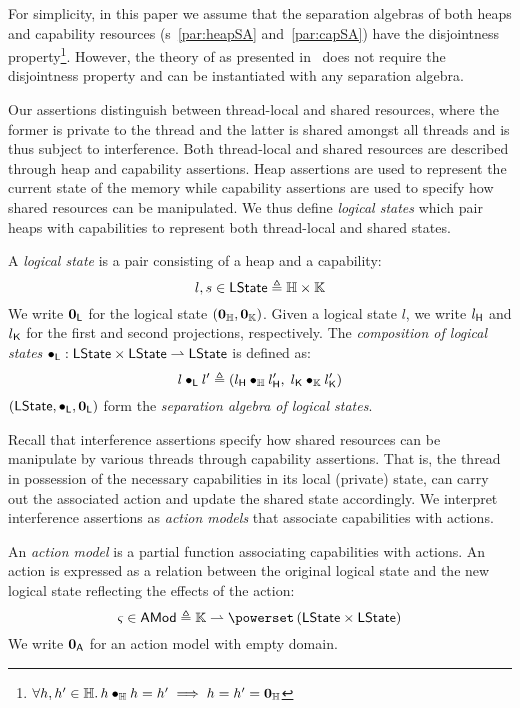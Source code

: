 For simplicity, in this paper we assume that the separation algebras of both heaps and capability resources (\param s~\ref{par:heapSA} and~\ref{par:capSA}) have the disjointness property\footnote{$\forall h, h' \in \mathbb{H}.\, h \bullet_{\mathbb{H}} h = h' \implies h = h' = \mathbf{0}_{\mathbb{H}}$}. However, the theory of \colosl as presented in~\cite{techreport} does not require the disjointness property and can be instantiated with any separation algebra.

Our assertions distinguish between thread-local and shared resources, where the former is private to the thread and the latter is shared amongst all threads and is thus subject to interference. Both thread-local and shared resources are described through heap and capability assertions. Heap assertions are used to represent the current state of the memory while capability assertions are used to specify how shared resources can be manipulated. We thus define \emph{logical states} which pair heaps with capabilities to represent both thread-local and shared states.
%
\begin{definition}A \emph{logical state} is a pair consisting of a heap and a capability:
%
\[
	l, s \in \textsf{LState} \triangleq \mathbb{H} \times \mathbb{K}
\]
%
We write $\mathbf{0}_{\textsf{L}}$ for the logical state $(\mathbf{0}_{\mathbb{H}}, \mathbf{0}_{\mathbb{K}})$. Given a logical state $l$, we write $l_{\textsf{H}}$ and $l_{\textsf{K}}$ for the first and second projections, respectively. The \emph{composition of logical states}
%
$
	\bullet_{\textsf{L}} : \textsf{LState} \times \textsf{LState} \rightharpoonup \textsf{LState}
$
%
is defined as:
%
\[
	l \bullet_{\textsf{L}} l' \triangleq (l_{\textsf{H}} \bullet_{\mathbb{H}} l'_{\textsf{H}},\; l_{\textsf{K}} \bullet_{\mathbb{K}} l'_{\textsf{K}})
\]
%
$(\textsf{LState}, \bullet_{\textsf{L}}, \mathbf{0}_{\textsf{L}})$ form the \emph{separation algebra of logical states}.
\end{definition}
%
%
Recall that interference assertions specify how shared resources can be manipulate by various threads through capability assertions. That is, the thread in possession of the necessary capabilities in its local (private) state, can carry out the associated action and update the shared state accordingly. We interpret interference assertions as \emph{action models} that associate capabilities with actions. 
%
\begin{definition}
An \emph{action model} is a partial function associating capabilities with actions. An action is expressed as a relation between the original logical state and the new logical state reflecting the effects of the action:
%
\[
	\amod{} \in \AMods \eqdef \Caps \rightharpoonup \pset{\LStates \times \LStates}
\]
%
We write $\mathbf{0}_{\textsf{A}}$ for an action model with empty domain.
%
\end{definition}
